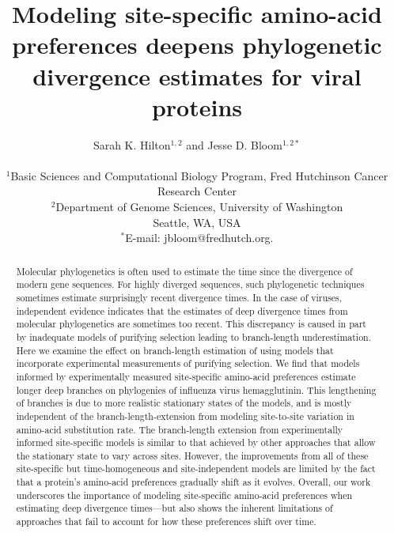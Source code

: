 \documentclass[11pt]{article}
\title{Modeling site-specific amino-acid preferences deepens phylogenetic divergence estimates for viral proteins}
\author
{Sarah K. Hilton$^{1,2}$  and Jesse D. Bloom$^{1,2*}$\\
\\
\footnotesize{$^1$Basic Sciences and Computational Biology Program, Fred Hutchinson Cancer Research Center}\\
\footnotesize{$^2$Department of Genome Sciences, University of Washington}\\
\footnotesize{Seattle, WA, USA}\\
\footnotesize{$^*$E-mail:  jbloom@fredhutch.org.}\\
}
\date{}
\begin{document}
 


\maketitle 


\begin{abstract}
\noindent  
Molecular phylogenetics is often used to estimate the time since the divergence of modern gene sequences.
For highly diverged sequences, such phylogenetic techniques sometimes estimate surprisingly recent divergence times. 
In the case of viruses, independent evidence indicates that the estimates of deep divergence times from molecular phylogenetics are sometimes too recent.
This discrepancy is caused in part by inadequate models of purifying selection leading to branch-length underestimation.
Here we examine the effect on branch-length estimation of using models that incorporate experimental measurements of purifying selection.
We find that models informed by experimentally measured site-specific amino-acid preferences estimate longer deep branches on phylogenies of influenza virus hemagglutinin.
This lengthening of branches is due to more realistic stationary states of the models, and is mostly independent of the branch-length-extension from modeling site-to-site variation in amino-acid substitution rate.
The branch-length extension from experimentally informed site-specific models is similar to that achieved by other approaches that allow the stationary state to vary across sites.
However, the improvements from all of these site-specific but time-homogeneous and site-independent models are limited by the fact that a protein's amino-acid preferences gradually shift as it evolves.
Overall, our work underscores the importance of modeling site-specific amino-acid preferences when estimating deep divergence times---but also shows the inherent limitations of approaches that fail to account for how these preferences shift over time.
\end{abstract}

\clearpage
\end{document}
